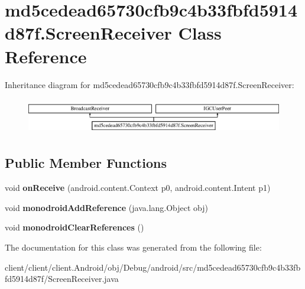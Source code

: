 \hypertarget{classmd5cedead65730cfb9c4b33fbfd5914d87f_1_1ScreenReceiver}{}\section{md5cedead65730cfb9c4b33fbfd5914d87f.\+Screen\+Receiver Class Reference}
\label{classmd5cedead65730cfb9c4b33fbfd5914d87f_1_1ScreenReceiver}
Inheritance diagram for md5cedead65730cfb9c4b33fbfd5914d87f.\+Screen\+Receiver\+:\begin{figure}[H]
\begin{center}
\leavevmode
\includegraphics[height=1.595442cm]{classmd5cedead65730cfb9c4b33fbfd5914d87f_1_1ScreenReceiver}
\end{center}
\end{figure}
\subsection*{Public Member Functions}
\begin{DoxyCompactItemize}
\item 
\hypertarget{classmd5cedead65730cfb9c4b33fbfd5914d87f_1_1ScreenReceiver_a89e694ace4502311e28f6e5044af653e}{}void {\bfseries on\+Receive} (android.\+content.\+Context p0, android.\+content.\+Intent p1)\label{classmd5cedead65730cfb9c4b33fbfd5914d87f_1_1ScreenReceiver_a89e694ace4502311e28f6e5044af653e}

\item 
\hypertarget{classmd5cedead65730cfb9c4b33fbfd5914d87f_1_1ScreenReceiver_a4e58638653efc108e041eb0ec9fe36ca}{}void {\bfseries monodroid\+Add\+Reference} (java.\+lang.\+Object obj)\label{classmd5cedead65730cfb9c4b33fbfd5914d87f_1_1ScreenReceiver_a4e58638653efc108e041eb0ec9fe36ca}

\item 
\hypertarget{classmd5cedead65730cfb9c4b33fbfd5914d87f_1_1ScreenReceiver_a60c3b35ad8f645e7df8cfc04c89990dc}{}void {\bfseries monodroid\+Clear\+References} ()\label{classmd5cedead65730cfb9c4b33fbfd5914d87f_1_1ScreenReceiver_a60c3b35ad8f645e7df8cfc04c89990dc}

\end{DoxyCompactItemize}


The documentation for this class was generated from the following file\+:\begin{DoxyCompactItemize}
\item 
client/client/client.\+Android/obj/\+Debug/android/src/md5cedead65730cfb9c4b33fbfd5914d87f/Screen\+Receiver.\+java\end{DoxyCompactItemize}
